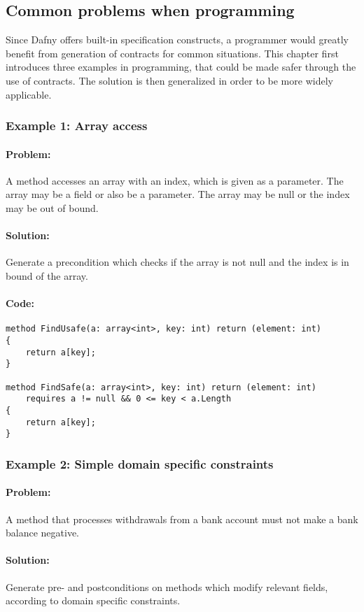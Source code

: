 \subsection{Common problems when programming} \label{examples}
Since Dafny offers built-in specification constructs, a programmer would greatly benefit from generation of contracts for common situations. This chapter first introduces three examples in programming, that could be made safer through the use of contracts. The solution is then generalized in order to be more widely applicable.
\subsubsection{Example 1: Array access} \label{Example 1}
\paragraph{Problem:}
A method accesses an array with an index, which is given as a parameter. The array may be a field or also be a parameter. The array may be null or the index may be out of bound.
\paragraph{Solution:}
Generate a precondition which checks if the array is not null and the index is in bound of the array.
\paragraph{Code:}
\begin{lstlisting}[language=dafny]
method FindUsafe(a: array<int>, key: int) return (element: int)
{
	return a[key];
}

method FindSafe(a: array<int>, key: int) return (element: int)
	requires a != null && 0 <= key < a.Length
{
	return a[key];
}
\end{lstlisting}
\subsubsection{Example 2: Simple domain specific constraints} \label{Example 2}
\paragraph{Problem:}
A method that processes withdrawals from a bank account must not make a bank balance negative.
\paragraph{Solution:}
Generate pre- and postconditions on methods which modify relevant fields, according to domain specific constraints.

